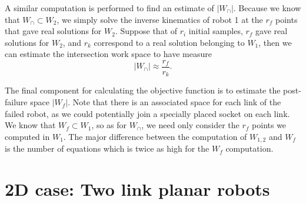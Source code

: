 \documentclass[12pt]{report}
\begin{document}

A similar computation is performed to find an estimate of $|W_\cap|$. Because we know that $W_\cap \subset W_2$, we simply solve the inverse kinematics of robot 1 at the $r_f$ points that gave real solutions for $W_2$. Suppose that of $r_i$ initial samples, $r_f$ gave real solutions for $W_2$, and $r_k$ correspond to a real solution belonging to 
 $W_1$, then we can estimate the intersection work space to have measure 
\[
|W_\cap| \approx \frac{r_f}{r_k} .
\]







The final component for calculating the objective function is to estimate the post-failure space $|W_f|$.  Note that there is an associated space for each link of the failed robot, as we could potentially join a specially placed socket on each link.  
%
We know that $W_f \subset W_1$, so as for $W_\cap$, we need only consider the $r_f$ points we computed in $W_1$.  The major difference between the computation of $W_{1,2}$ and $W_f$ is the number of equations which is twice as high for the $W_f$ computation. 
%












\section{2D case: Two link planar robots} \label{sec:twojoint}
\end{document}

